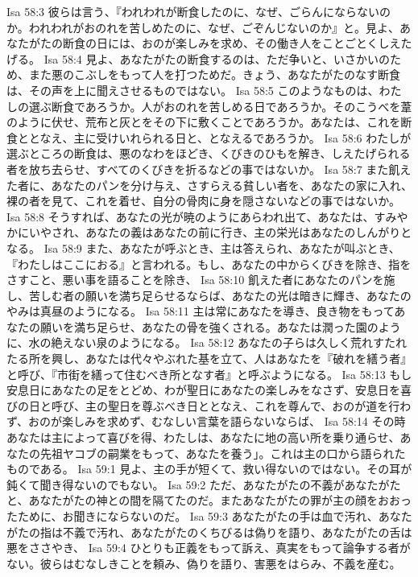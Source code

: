 Isa 58:3  彼らは言う、『われわれが断食したのに、なぜ、ごらんにならないのか。われわれがおのれを苦しめたのに、なぜ、ごぞんじないのか』と。見よ、あなたがたの断食の日には、おのが楽しみを求め、その働き人をことごとくしえたげる。
Isa 58:4  見よ、あなたがたの断食するのは、ただ争いと、いさかいのため、また悪のこぶしをもって人を打つためだ。きょう、あなたがたのなす断食は、その声を上に聞えさせるものではない。
Isa 58:5  このようなものは、わたしの選ぶ断食であろうか。人がおのれを苦しめる日であろうか。そのこうべを葦のように伏せ、荒布と灰とをその下に敷くことであろうか。あなたは、これを断食ととなえ、主に受けいれられる日と、となえるであろうか。
Isa 58:6  わたしが選ぶところの断食は、悪のなわをほどき、くびきのひもを解き、しえたげられる者を放ち去らせ、すべてのくびきを折るなどの事ではないか。
Isa 58:7  また飢えた者に、あなたのパンを分け与え、さすらえる貧しい者を、あなたの家に入れ、裸の者を見て、これを着せ、自分の骨肉に身を隠さないなどの事ではないか。
Isa 58:8  そうすれば、あなたの光が暁のようにあらわれ出て、あなたは、すみやかにいやされ、あなたの義はあなたの前に行き、主の栄光はあなたのしんがりとなる。
Isa 58:9  また、あなたが呼ぶとき、主は答えられ、あなたが叫ぶとき、『わたしはここにおる』と言われる。もし、あなたの中からくびきを除き、指をさすこと、悪い事を語ることを除き、
Isa 58:10  飢えた者にあなたのパンを施し、苦しむ者の願いを満ち足らせるならば、あなたの光は暗きに輝き、あなたのやみは真昼のようになる。
Isa 58:11  主は常にあなたを導き、良き物をもってあなたの願いを満ち足らせ、あなたの骨を強くされる。あなたは潤った園のように、水の絶えない泉のようになる。
Isa 58:12  あなたの子らは久しく荒れすたれたる所を興し、あなたは代々やぶれた基を立て、人はあなたを『破れを繕う者』と呼び、『市街を繕って住むべき所となす者』と呼ぶようになる。
Isa 58:13  もし安息日にあなたの足をとどめ、わが聖日にあなたの楽しみをなさず、安息日を喜びの日と呼び、主の聖日を尊ぶべき日ととなえ、これを尊んで、おのが道を行わず、おのが楽しみを求めず、むなしい言葉を語らないならば、
Isa 58:14  その時あなたは主によって喜びを得、わたしは、あなたに地の高い所を乗り通らせ、あなたの先祖ヤコブの嗣業をもって、あなたを養う」。これは主の口から語られたものである。
Isa 59:1  見よ、主の手が短くて、救い得ないのではない。その耳が鈍くて聞き得ないのでもない。
Isa 59:2  ただ、あなたがたの不義があなたがたと、あなたがたの神との間を隔てたのだ。またあなたがたの罪が主の顔をおおったために、お聞きにならないのだ。
Isa 59:3  あなたがたの手は血で汚れ、あなたがたの指は不義で汚れ、あなたがたのくちびるは偽りを語り、あなたがたの舌は悪をささやき、
Isa 59:4  ひとりも正義をもって訴え、真実をもって論争する者がない。彼らはむなしきことを頼み、偽りを語り、害悪をはらみ、不義を産む。
